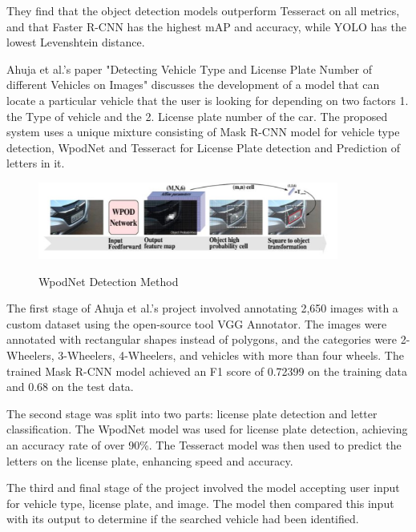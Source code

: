 They find that the object detection models outperform Tesseract on all metrics, and that Faster R-CNN has the highest mAP and accuracy, while YOLO has the lowest Levenshtein distance. \cite{anderssonBenchmarkingObjectDetection2022}


Ahuja et al.'s paper "Detecting Vehicle Type and License Plate Number of different Vehicles on Images" discusses the development of a model that can locate a particular vehicle that the user is looking for depending on two factors 1. the Type of vehicle and the 2. License plate number of the car. The proposed system uses a unique mixture consisting of Mask R-CNN model for vehicle type detection, WpodNet and Tesseract for License Plate detection and Prediction of letters in it.
\cite{ahujaDetectingVehicleType}

\begin{figure}[ht]
    \centering
    \includegraphics[width=0.88\textwidth]{Figures/tesseract_papers/Ahuja_2021.jpg}
    \caption[WpodNet Detection Method]{WpodNet Detection Method}\cite{ahujaDetectingVehicleType}
    \label{fig:WpodNet Detection Method}
\end{figure}

The first stage of Ahuja et al.'s project involved annotating 2,650 images with a custom dataset using the open-source tool VGG Annotator. The images were annotated with rectangular shapes instead of polygons, and the categories were 2-Wheelers, 3-Wheelers, 4-Wheelers, and vehicles with more than four wheels. The trained Mask R-CNN model achieved an F1 score of 0.72399 on the training data and 0.68 on the test data.

The second stage was split into two parts: license plate detection and letter classification. The WpodNet model was used for license plate detection, achieving an accuracy rate of over 90\%. The Tesseract model was then used to predict the letters on the license plate, enhancing speed and accuracy.

The third and final stage of the project involved the model accepting user input for vehicle type, license plate, and image. The model then compared this input with its output to determine if the searched vehicle had been identified.

